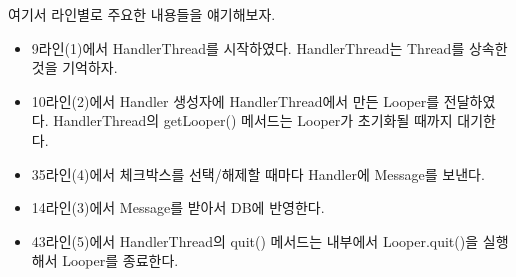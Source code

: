 여기서 라인별로 주요한 내용들을 얘기해보자.
\begin{itemize}
\item 9라인(1)에서 HandlerThread를 시작하였다. HandlerThread는 Thread를 상속한 것을 기억하자.
\item 10라인(2)에서 Handler 생성자에 HandlerThread에서 만든 Looper를 전달하였다. HandlerThread의 getLooper() 메서드는 Looper가 초기화될 때까지 대기한다.
\item 35라인(4)에서 체크박스를 선택/해제할 때마다 Handler에 Message를 보낸다.
\item 14라인(3)에서 Message를 받아서 DB에 반영한다.
\item 43라인(5)에서 HandlerThread의 quit() 메서드는 내부에서 Looper.quit()을 실행해서 Looper를 종료한다.
\end{itemize}

